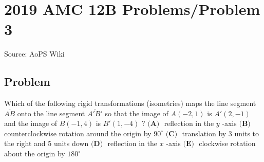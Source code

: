 \documentclass[12pt]{article}
\begin{document}
\section*{{2019 AMC 12B Problems/Problem 3}}
Source: AoPS Wiki

\subsection*{Problem}
Which of the following rigid transformations (isometries) maps the line segment $\overline{AB}$ onto the line segment $\overline{A'B'}$ so that the image of $A(-2, 1)$ is $A'(2, -1)$ and the image of $B(-1, 4)$ is $B'(1, -4)$ ? $\textbf{(A) }$ reflection in the $y$ -axis $\textbf{(B) }$ counterclockwise rotation around the origin by $90^{\circ}$ $\textbf{(C) }$ translation by 3 units to the right and 5 units down $\textbf{(D) }$ reflection in the $x$ -axis $\textbf{(E) }$ clockwise rotation about the origin by $180^{\circ}$
\end{document}
